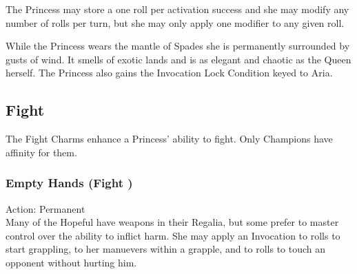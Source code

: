 The Princess may store a one roll per activation success and she may modify any number of rolls per turn, but she may only apply one modifier to any given roll. 

While the Princess wears the mantle of Spades she is permanently surrounded by gusts of wind. It smells of exotic lands and is as elegant and chaotic as the Queen herself. The Princess also gains the Invocation Lock Condition keyed to Aria.

\subsection*{Fight}
The Fight Charms enhance a Princess' ability to fight. Only Champions have affinity for them.

\subsubsection*{Empty Hands (Fight \textbullet)}

\noindent Action: Permanent \\

\noindent Many of the Hopeful have weapons in their Regalia, but some prefer to master control over the ability to inflict harm. She may apply an Invocation to rolls to start grappling, to her manuevers within a grapple, and to rolls to touch an opponent without hurting him.

